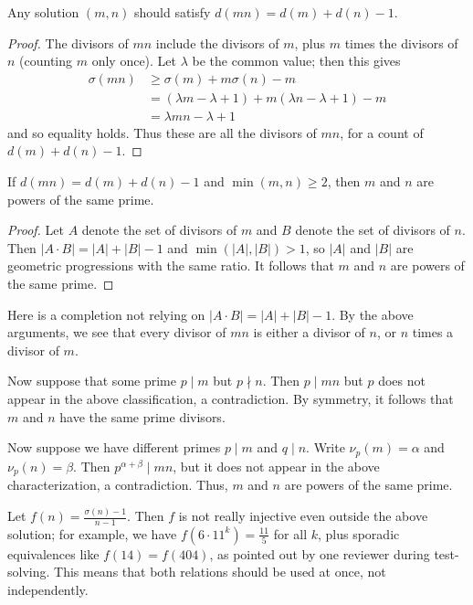 \documentclass[11pt]{scrartcl}
\begin{document}
\begin{claim*}
  Any solution $(m,n)$ should satisfy
  $d(mn) = d(m) + d(n) - 1$.
\end{claim*}
\begin{proof}
  The divisors of $mn$ include the divisors of $m$,
  plus $m$ times the divisors of $n$ (counting $m$ only once).
  Let $\lambda$ be the common value; then this gives
  \begin{align*}
    \sigma(mn) & \ge \sigma(m) + m\sigma(n) - m\\
    & = (\lambda m - \lambda + 1) + m(\lambda n - \lambda + 1) - m\\
    & = \lambda mn - \lambda + 1
  \end{align*}
  and so equality holds.
  Thus these are all the divisors of $mn$,
  for a count of $d(m) + d(n) - 1$.
\end{proof}

\begin{claim*}
  If $d(mn) = d(m) + d(n) - 1$ and $\min(m, n) \ge 2$,
  then $m$ and $n$ are powers of the same prime.
\end{claim*}
\begin{proof}
  Let $A$ denote the set of divisors of $m$ and $B$ denote the set of divisors of $n$.
  Then $|A \cdot B| = |A| + |B| - 1$ and $\min(|A|, |B|) > 1$,
  so $|A|$ and $|B|$ are geometric progressions with the same ratio.
  It follows that $m$ and $n$ are powers of the same prime.
\end{proof}

\begin{remark*}
  Here is a completion not relying on $|A \cdot B| = |A| + |B| - 1$.
  By the above arguments, we see that every divisor of $mn$ is
  either a divisor of $n$, or $n$ times a divisor of $m$.

  Now suppose that some prime $p \mid m$ but $p \nmid n$.
  Then $p \mid mn$ but $p$ does not appear in the above classification,
  a contradiction.
  By symmetry, it follows that $m$ and $n$ have the same prime divisors.

  Now suppose we have different primes $p \mid m$ and $q \mid n$.
  Write $\nu_p(m) = \alpha$ and $\nu_p(n) = \beta$.
  Then $p^{\alpha+\beta} \mid mn$, but it does not appear in the above characterization,
  a contradiction.
  Thus, $m$ and $n$ are powers of the same prime.
\end{remark*}

\begin{remark*}
  Let $f(n) = \frac{\sigma(n)-1}{n-1}$.
  Then $f$ is not really injective even outside the above solution;
  for example, we have $f(6 \cdot 11^k) = \frac{11}{5}$ for all $k$,
  plus sporadic equivalences like $f(14) = f(404)$,
  as pointed out by one reviewer during test-solving.
  This means that both relations should be used at once, not independently.
\end{remark*}
\end{document}
